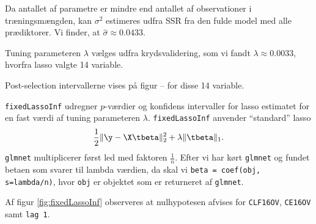 Da antallet af parametre er mindre end antallet af observationer i træningsmængden, kan \(\sigma^2\) estimeres udfra SSR fra den fulde model med alle prædiktorer.
Vi finder, at \(\widehat{\sigma} \approx 0.0433\).

Tuning parameteren \(\lambda\) vælges udfra krydsvalidering, som vi fandt \(\lambda \approx 0.0033\), hvorfra lasso valgte 14 variable.





Post-selection intervallerne vises på figur -- for disse 14 variable.


\texttt{fixedLassoInf} udregner \(p\)-værdier og konfidens intervaller for lasso estimatet for en fast værdi af tuning parameteren \(\lambda\).
\texttt{fixedLassoInf} anvender ``standard'' lasso
\begin{align*}
\frac{1}{2} \Vert \y - \X \tbeta \Vert_2^2 + \lambda \Vert \tbeta \Vert_1.
\end{align*}
\texttt{glmnet} multiplicerer først led med faktoren \(\frac{1}{n}\).
Efter vi har kørt \texttt{glmnet} og fundet betaen som svarer til lambda værdien, da skal vi \texttt{beta = coef(obj, s=lambda/n)}, hvor \texttt{obj} er objektet som er returneret af \texttt{glmnet}.


Af figur \ref{fig:fixedLassoInf} observeres at nulhypotesen afvises for \texttt{CLF16OV}, \texttt{CE16OV} samt \texttt{lag 1}.


